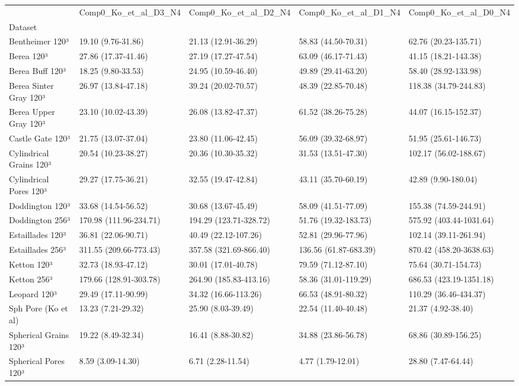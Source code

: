 \begin{tabular}{lllll}
\toprule
 & Comp0_Ko_et_al_D3_N4 & Comp0_Ko_et_al_D2_N4 & Comp0_Ko_et_al_D1_N4 & Comp0_Ko_et_al_D0_N4 \\
Dataset &  &  &  &  \\
\midrule
Bentheimer 120³ & 19.10 (9.76-31.86) & 21.13 (12.91-36.29) & 58.83 (44.50-70.31) & 62.76 (20.23-135.71) \\
Berea 120³ & 27.86 (17.37-41.46) & 27.19 (17.27-47.54) & 63.09 (46.17-71.43) & 41.15 (18.21-143.38) \\
Berea Buff 120³ & 18.25 (9.80-33.53) & 24.95 (10.59-46.40) & 49.89 (29.41-63.20) & 58.40 (28.92-133.98) \\
Berea Sinter Gray 120³ & 26.97 (13.84-47.18) & 39.24 (20.02-70.57) & 48.39 (22.85-70.48) & 118.38 (34.79-244.83) \\
Berea Upper Gray 120³ & 23.10 (10.02-43.39) & 26.08 (13.82-47.37) & 61.52 (38.26-75.28) & 44.07 (16.15-152.37) \\
Castle Gate 120³ & 21.75 (13.07-37.04) & 23.80 (11.06-42.45) & 56.09 (39.32-68.97) & 51.95 (25.61-146.73) \\
Cylindrical Grains 120³ & 20.54 (10.23-38.27) & 20.36 (10.30-35.32) & 31.53 (13.51-47.30) & 102.17 (56.02-188.67) \\
Cylindrical Pores 120³ & 29.27 (17.75-36.21) & 32.55 (19.47-42.84) & 43.11 (35.70-60.19) & 42.89 (9.90-180.04) \\
Doddington 120³ & 33.68 (14.54-56.52) & 30.68 (13.67-45.49) & 58.09 (41.51-77.09) & 155.38 (74.59-244.91) \\
Doddington 256³ & 170.98 (111.96-234.71) & 194.29 (123.71-328.72) & 51.76 (19.32-183.73) & 575.92 (403.44-1031.64) \\
Estaillades 120³ & 36.81 (22.06-90.71) & 40.49 (22.12-107.26) & 52.81 (29.96-77.96) & 102.14 (39.11-261.94) \\
Estaillades 256³ & 311.55 (209.66-773.43) & 357.58 (321.69-866.40) & 136.56 (61.87-683.39) & 870.42 (458.20-3638.63) \\
Ketton 120³ & 32.73 (18.93-47.12) & 30.01 (17.01-40.78) & 79.59 (71.12-87.10) & 75.64 (30.71-154.73) \\
Ketton 256³ & 179.66 (128.91-303.78) & 264.90 (185.83-413.16) & 58.36 (31.01-119.29) & 686.53 (423.19-1351.18) \\
Leopard 120³ & 29.49 (17.11-90.99) & 34.32 (16.66-113.26) & 66.53 (48.91-80.32) & 110.29 (36.46-434.37) \\
Sph Pore (Ko et al) & 13.23 (7.21-29.32) & 25.90 (8.03-39.49) & 22.54 (11.40-40.48) & 21.37 (4.92-38.40) \\
Spherical Grains 120³ & 19.22 (8.49-32.34) & 16.41 (8.88-30.82) & 34.88 (23.86-56.78) & 68.86 (30.89-156.25) \\
Spherical Pores 120³ & 8.59 (3.09-14.30) & 6.71 (2.28-11.54) & 4.77 (1.79-12.01) & 28.80 (7.47-64.44) \\
\bottomrule
\end{tabular}
